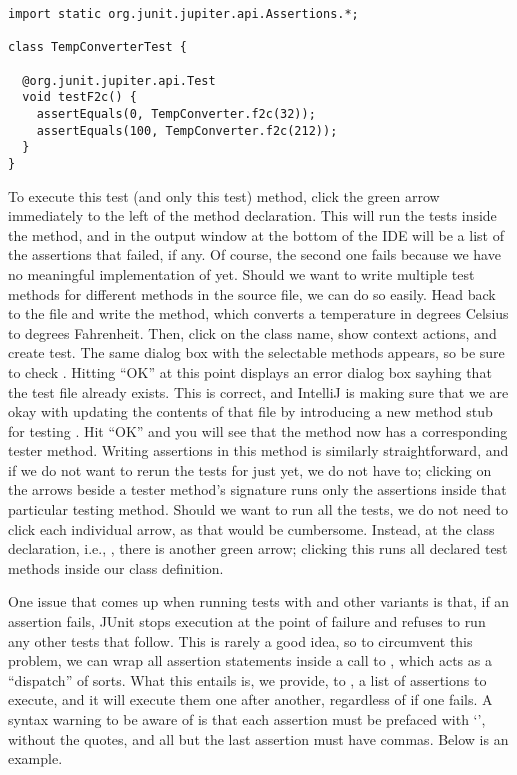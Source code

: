\begin{cl}[]{}
\begin{lstlisting}[language=MyJava]
import static org.junit.jupiter.api.Assertions.*;

class TempConverterTest {

  @org.junit.jupiter.api.Test
  void testF2c() {
    assertEquals(0, TempConverter.f2c(32));
    assertEquals(100, TempConverter.f2c(212));
  }
}
\end{lstlisting}
\end{cl}

To execute this test (and only this test) method, click the green arrow immediately to the left of the method declaration. This will run the tests inside the method, and in the output window at the bottom of the IDE will be a list of the assertions that failed, if any. Of course, the second one fails because we have no meaningful implementation of  yet. Should we want to write multiple test methods for different methods in the source file, we can do so easily. Head back to the  file and write the  method, which converts a temperature in degrees Celsius to degrees Fahrenheit. Then, click on the class name, show context actions, and create test. The same dialog box with the selectable methods appears, so be sure to check . Hitting ``OK'' at this point displays an error dialog box sayhing that the test file already exists. This is correct, and IntelliJ is making sure that we are okay with updating the contents of that file by introducing a new method stub for testing . Hit ``OK'' and you will see that the  method now has a corresponding tester method. Writing assertions in this method is similarly straightforward, and if we do not want to rerun the tests for  just yet, we do not have to; clicking on the arrows beside a tester method's signature runs only the assertions inside that particular testing method. Should we want to run all the tests, we do not need to click each individual arrow, as that would be cumbersome. Instead, at the class declaration, i.e., , there is another green arrow; clicking this runs all declared test methods inside our class definition.

One issue that comes up when running tests with  and other variants is that, if an assertion fails, JUnit stops execution at the point of failure and refuses to run any other tests that follow. This is rarely a good idea, so to circumvent this problem, we can wrap all assertion statements inside a call to , which acts as a ``dispatch'' of sorts. What this entails is, we provide, to , a list of assertions to execute, and it will execute them one after another, regardless of if one fails. A syntax warning to be aware of is that each assertion must be prefaced with `\ttt{() -> }', without the quotes, and all but the last assertion must have commas. Below is an example.

